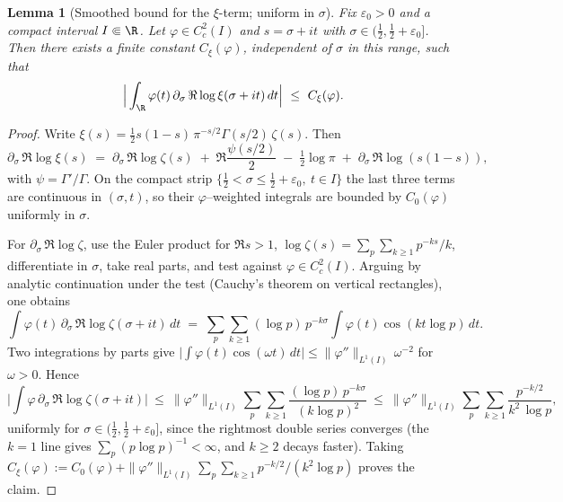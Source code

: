 \documentclass[11pt]{article}
\newtheorem{lemma}[theorem]{Lemma}
\theoremstyle{remark}
\begin{document}
\begin{lemma}[Smoothed bound for the \(\xi\)-term; uniform in \(\sigma\)]\label{lem:xi-smoothed}
Fix \(\varepsilon_0>0\) and a compact interval \(I\Subset\R\). Let \(\varphi\in C_c^2(I)\) and \(s=\sigma+it\) with \(\sigma\in(\tfrac12,\tfrac12+\varepsilon_0]\). Then there exists a finite constant \(C_\xi(\varphi)\), independent of \(\sigma\) in this range, such that
\[
 \Big|\int_{\R}\varphi(t)\,\partial_\sigma\,\Re\log\xi(\sigma+it)\,dt\Big|\ \le\ C_\xi(\varphi).
\]
\end{lemma}
\begin{proof}
Write \(\xi(s)=\tfrac12 s(1-s)\,\pi^{-s/2}\Gamma(s/2)\,\zeta(s)\). Then
\[
 \partial_\sigma\,\Re\log\xi(s)\;=\;\partial_\sigma\,\Re\log\zeta(s)\; +\; \Re\frac{\psi(s/2)}{2}\; -\; \tfrac12\log\pi\; +\; \partial_\sigma\,\Re\log(s(1-s)),
\]
with \(\psi=\Gamma'/\Gamma\). On the compact strip \(\{\tfrac12<\sigma\le\tfrac12+\varepsilon_0,\ t\in I\}\) the last three terms are continuous in \((\sigma,t)\), so their \(\varphi\)–weighted integrals are bounded by \(C_0(\varphi)\) uniformly in \(\sigma\).

For \(\partial_\sigma\,\Re\log\zeta\), use the Euler product for \(\Re s>1\),
\(\log\zeta(s)=\sum_{p}\sum_{k\ge1}p^{-ks}/k\),
differentiate in \(\sigma\), take real parts, and test against \(\varphi\in C_c^2(I)\). Arguing by analytic continuation under the test (Cauchy's theorem on vertical rectangles), one obtains
\[
 \int \varphi(t)\,\partial_\sigma\,\Re\log\zeta(\sigma+it)\,dt\;=\;\sum_{p}\sum_{k\ge1} (\log p)\,p^{-k\sigma}\int \varphi(t)\cos(kt\log p)\,dt.
\]
Two integrations by parts give \(\big|\int \varphi(t)\cos(\omega t)\,dt\big|\le \|\varphi''\|_{L^1(I)}\,\omega^{-2}\) for \(\omega>0\). Hence
\[
 \Big|\int \varphi\,\partial_\sigma\,\Re\log\zeta(\sigma+it)\Big|\ \le\ \|\varphi''\|_{L^1(I)}\sum_{p}\sum_{k\ge1}\frac{(\log p)\,p^{-k\sigma}}{(k\log p)^2}\ \le\ \|\varphi''\|_{L^1(I)}\sum_{p}\sum_{k\ge1}\frac{p^{-k/2}}{k^2\,\log p},
\]
uniformly for \(\sigma\in(\tfrac12,\tfrac12+\varepsilon_0]\), since the rightmost double series converges (the \(k\!=\!1\) line gives \(\sum_{p}(p\log p)^{-1}<\infty\), and \(k\ge2\) decays faster). Taking \(C_\xi(\varphi):=C_0(\varphi)+\|\varphi''\|_{L^1(I)}\sum_{p}\sum_{k\ge1}p^{-k/2}/(k^2\log p)\) proves the claim.
\end{proof}
\end{document}
